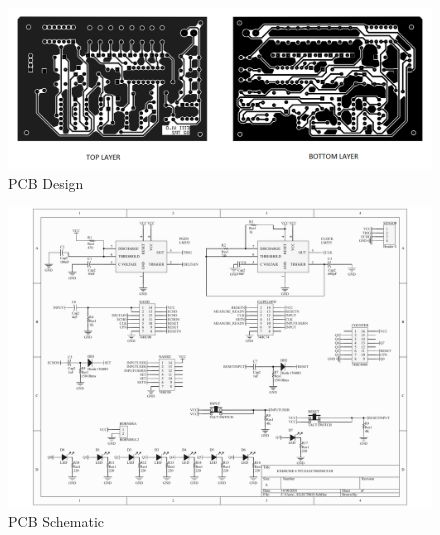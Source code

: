 \begin{figure}[h!]
\begin{centering}
\includegraphics[scale=0.7]{../Exercise8/Informe/images/PCB_Layers}
\par\end{centering}
\caption{\color{cyan}PCB Design}
\label{8_9}
\end{figure}

\begin{figure}[h!]
\begin{centering}
\includegraphics[scale=0.6]{../Exercise8/Informe/Schematic}
\par\end{centering}
\caption{PCB Schematic}

\end{figure}

